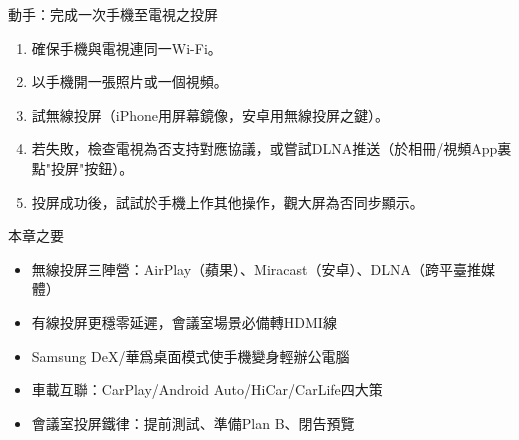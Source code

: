 \begin{tcbpractice}{動手：完成一次手機至電視之投屏}
\begin{enumerate}
  \item 確保手機與電視連同一Wi-Fi。
  \item 以手機開一張照片或一個視頻。
  \item 試無線投屏（iPhone用屏幕鏡像，安卓用無線投屏之鍵）。
  \item 若失敗，檢查電視為否支持對應協議，或嘗試DLNA推送（於相冊/視頻App裏點"投屏"按鈕）。
  \item 投屏成功後，試試於手機上作其他操作，觀大屏為否同步顯示。
\end{enumerate}

\end{tcbpractice}

\begin{tcbsummary}{本章之要}
\begin{itemize}
  \item 無線投屏三陣營：AirPlay（蘋果）、Miracast（安卓）、DLNA（跨平臺推媒體）
  \item 有線投屏更穩零延遲，會議室場景必備轉HDMI線
  \item Samsung DeX/華爲桌面模式使手機變身輕辦公電腦
  \item 車載互聯：CarPlay/Android Auto/HiCar/CarLife四大策
  \item 會議室投屏鐵律：提前測試、準備Plan B、閉告預覽
\end{itemize}

\end{tcbsummary}
